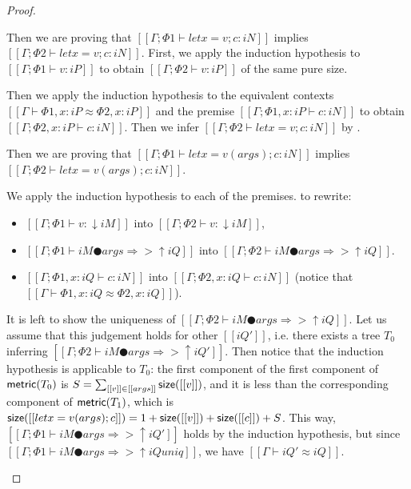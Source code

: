 \begin{proof}
\begin{caseof}
        \item {}
            Then we are proving that 
            $[[Γ ; Φ1 ⊢ let x = v; c : iN]]$ implies $[[Γ ; Φ2 ⊢ let x = v; c : iN]]$.
            First, we apply the induction hypothesis to 
            $[[Γ; Φ1 ⊢ v : iP]]$ to obtain $[[Γ; Φ2 ⊢ v : iP]]$ 
            of the same pure size.
            
            Then we apply the induction hypothesis to
            the equivalent contexts $[[Γ ⊢ Φ1, x:iP ≈ Φ2, x:iP]]$
            and the premise $[[Γ ; Φ1, x:iP ⊢ c : iN]]$ to obtain
            $[[Γ ; Φ2, x:iP ⊢ c : iN]]$.
            Then we infer $[[Γ ; Φ2 ⊢ let x = v; c : iN]]$ by .

        \item {}
            Then we are proving that 
            $[[Γ ; Φ1 ⊢ let x = v(args); c : iN]]$ implies 
            $[[Γ ; Φ2 ⊢ let x = v(args); c : iN]]$.

            We apply the induction hypothesis to each of the premises.
            to rewrite:
            \begin{itemize}
                \item $[[Γ ; Φ1 ⊢ v : ↓iM]]$ into $[[Γ ; Φ2 ⊢ v : ↓iM]]$,
                \item $[[Γ ; Φ1 ⊢ iM ● args ⇒> ↑iQ]]$ into $[[Γ ; Φ2 ⊢ iM ● args ⇒> ↑iQ]]$.
                \item $[[Γ ; Φ1, x:iQ ⊢ c : iN]]$ into $[[Γ ; Φ2, x:iQ ⊢ c : iN]]$
                (notice that $[[Γ ⊢ Φ1, x:iQ ≈ Φ2, x:iQ]]$).
            \end{itemize}

            It is left to show the uniqueness of $[[Γ ; Φ2 ⊢ iM ● args ⇒> ↑iQ]]$.
            Let us assume that this judgement holds for other $[[iQ']]$, 
            i.e.  there exists a tree $T_0$ inferring 
            $[[Γ ; Φ2 ⊢ iM ● args ⇒> ↑iQ']]$.
            Then notice that the induction hypothesis is applicable to
            $T_0$: the first component of the first component of $\mathsf{metric}(T_0)$
            is $S = \sum_{[[v]] \in [[args]]} \mathsf{size}([[v]])$, and it is less than
            the corresponding component of $\mathsf{metric}(T_1)$, which is
            $\mathsf{size}([[let x = v(args); c]]) = 1 + \mathsf{size}([[v]]) + \mathsf{size}([[c]]) + S$.
            This way, $[[Γ ; Φ1 ⊢ iM ● args ⇒> ↑iQ']]$ holds by the induction hypothesis,
            but since $[[Γ ; Φ1 ⊢ iM ● args ⇒> ↑iQ uniq]]$, we have $[[Γ ⊢ iQ' ≈ iQ]]$.


\end{caseof}
\end{proof}
